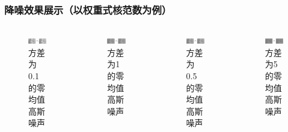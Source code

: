 \documentclass[10pt,aspectratio=43,mathserif]{beamer}
\begin{document}
\begin{frame}
\frametitle{\textbf{降噪效果展示（以权重式核范数为例）}}
\begin{columns}
\begin{figure}
\centering
\includegraphics[scale=0.25]{Screenshot_1.png}
\caption{方差为0.1的零均值高斯噪声}
\end{figure}

\begin{figure}
\centering
\includegraphics[scale=0.25]{Screenshot_3.png}
\caption{方差为1的零均值高斯噪声}
\end{figure}

\begin{figure}
\centering
\includegraphics[scale=0.25]{Screenshot_2.png}
\caption{方差为0.5的零均值高斯噪声}
\end{figure}

\begin{figure}
\centering
\includegraphics[scale=0.25]{Screenshot_4.png}
\caption{方差为5的零均值高斯噪声}
\end{figure}


\end{columns}
\end{frame}
\end{document}
